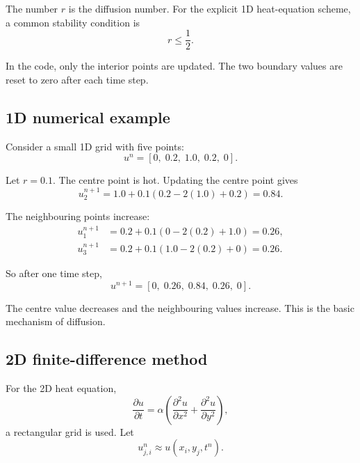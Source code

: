 \documentclass[11pt,a4paper]{article}
\begin{document}
The number \(r\) is the diffusion number. For the explicit 1D heat-equation scheme, a common stability condition is
\begin{equation}
    r \leq \frac{1}{2}.
\end{equation}

In the code, only the interior points are updated. The two boundary values are reset to zero after each time step.

\subsection{1D numerical example}

Consider a small 1D grid with five points:
\begin{equation}
    u^n = [0,\;0.2,\;1.0,\;0.2,\;0].
\end{equation}

Let \(r=0.1\). The centre point is hot. Updating the centre point gives
\begin{equation}
    u_2^{n+1}
    =
    1.0
    +
    0.1(0.2 - 2(1.0) + 0.2)
    =
    0.84.
\end{equation}

The neighbouring points increase:
\begin{align}
    u_1^{n+1}
    &=
    0.2 + 0.1(0 - 2(0.2) + 1.0)
    =
    0.26,\\
    u_3^{n+1}
    &=
    0.2 + 0.1(1.0 - 2(0.2) + 0)
    =
    0.26.
\end{align}

So after one time step,
\begin{equation}
    u^{n+1} = [0,\;0.26,\;0.84,\;0.26,\;0].
\end{equation}

The centre value decreases and the neighbouring values increase. This is the basic mechanism of diffusion.

\subsection{2D finite-difference method}

For the 2D heat equation,
\begin{equation}
    \frac{\partial u}{\partial t}
    =
    \alpha
    \left(
    \frac{\partial^2 u}{\partial x^2}
    +
    \frac{\partial^2 u}{\partial y^2}
    \right),
\end{equation}
a rectangular grid is used. Let
\begin{equation}
    u_{j,i}^{n} \approx u(x_i,y_j,t^n).
\end{equation}
\end{document}

